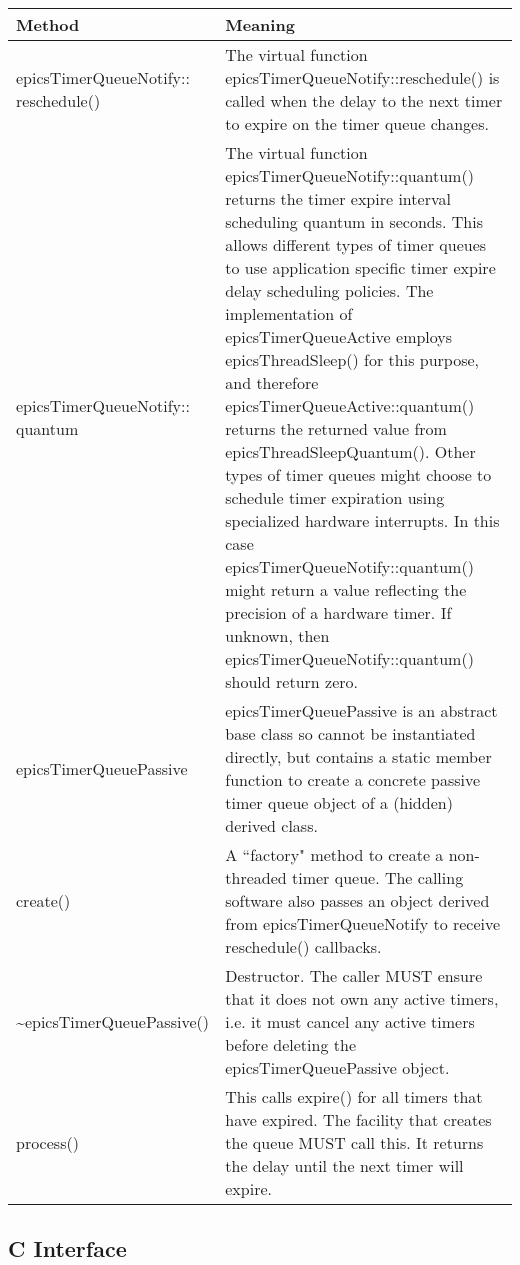 \begin{center}
\begin{longtable}{p{1.6in}p{4.9in}}
\textbf{Method} & \textbf{Meaning}\\
\hline
\index{epicsTimerQueueNotify}
epicsTimerQueueNotify:: reschedule() &
The virtual function epicsTimerQueueNotify::reschedule() is called when the delay to the next timer to expire on the timer queue changes.\\

epicsTimerQueueNotify:: quantum &
The virtual function epicsTimerQueueNotify::quantum() returns the timer expire interval scheduling quantum in seconds.
This allows different types of timer queues to use application specific timer expire delay scheduling policies.
The implementation of epicsTimerQueueActive employs epicsThreadSleep() for this purpose, and therefore epicsTimerQueueActive::quantum() returns the returned value from epicsThreadSleepQuantum().
Other types of timer queues might choose to schedule timer expiration using specialized hardware interrupts.
In this case epicsTimerQueueNotify::quantum() might return a value reflecting the precision of a hardware timer.
If unknown, then epicsTimerQueueNotify::quantum() should return zero.\\

\index{epicsTimerQueuePassive}
epicsTimerQueuePassive &
epicsTimerQueuePassive is an abstract base class so cannot be instantiated directly, but contains a static member function to create a concrete passive timer queue object of a (hidden) derived class.\\

create() &
A ``factory" method to create a non-threaded timer queue.
The calling software also passes an object derived from epicsTimerQueueNotify to receive reschedule() callbacks.\\

\~{}epicsTimerQueuePassive() &
Destructor.
The caller MUST ensure that it does not own any active timers, i.e. it must cancel any active timers before deleting the epicsTimerQueuePassive object.\\

process() &
This calls expire() for all timers that have expired.
The facility that creates the queue MUST call this.
It returns the delay until the next timer will expire.
\end{longtable}

\end{center}


\subsection{C Interface}

